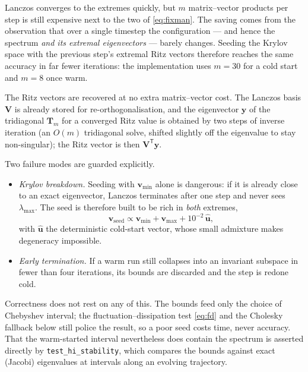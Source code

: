 \documentclass[11pt,a4paper]{report}
\newcommand{\code}[1]{\texttt{\seqsplitcode{#1}}}
\newcommand{\seqsplitcode}[1]{#1}
\begin{document}
Lanczos converges to the extremes quickly, but $m$ matrix--vector products per
step is still expensive next to the two of \eqref{eq:fixman}. The saving comes
from the observation that over a single timestep the configuration --- and hence
the spectrum \emph{and its extremal eigenvectors} --- barely changes. Seeding the
Krylov space with the previous step's extremal Ritz vectors therefore reaches the
same accuracy in far fewer iterations: the implementation uses $m = 30$ for a cold
start and $m = 8$ once warm.

The Ritz vectors are recovered at no extra matrix--vector cost. The Lanczos basis
$\bm{V}$ is already stored for re-orthogonalisation, and the eigenvector $\bm{y}$
of the tridiagonal $\bm{T}_m$ for a converged Ritz value is obtained by two steps
of inverse iteration (an $O(m)$ tridiagonal solve, shifted slightly off the
eigenvalue to stay non-singular); the Ritz vector is then
$\bm{V}^{\mathsf{T}}\bm{y}$.

Two failure modes are guarded explicitly.
\begin{itemize}
  \item \emph{Krylov breakdown.} Seeding with $\bm{v}_{\min}$ alone is
        dangerous: if it is already close to an exact eigenvector, Lanczos
        terminates after one step and never sees $\lambda_{\max}$. The seed is
        therefore built to be rich in \emph{both} extremes,
        \begin{equation}
          \bm{v}_{\mathrm{seed}} \propto
            \bm{v}_{\min} + \bm{v}_{\max} + 10^{-2}\,\hat{\bm{u}},
        \end{equation}
        with $\hat{\bm{u}}$ the deterministic cold-start vector, whose small
        admixture makes degeneracy impossible.
  \item \emph{Early termination.} If a warm run still collapses into an invariant
        subspace in fewer than four iterations, its bounds are discarded and the
        step is redone cold.
\end{itemize}

Correctness does not rest on any of this. The bounds feed only the choice of
Chebyshev interval; the fluctuation--dissipation test \eqref{eq:fd} and the
Cholesky fallback below still police the result, so a poor seed costs time, never
accuracy. That the warm-started interval nevertheless does contain the spectrum is
asserted directly by \code{test\_hi\_stability}, which compares the bounds against
exact (Jacobi) eigenvalues at intervals along an evolving trajectory.
\end{document}
